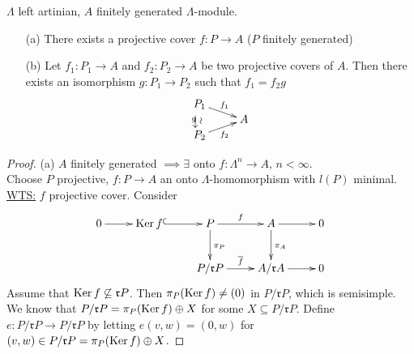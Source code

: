 \begin{thm}
\label{thm:proj-cov_unique}
$\Lambda$ left artinian, $A$ finitely generated $\Lambda$-module.
\begin{enumerate}
\item[(a)] There exists a projective cover $f:P\to A$ ($P$ finitely generated)
\item[(b)] Let $f_1 : P_1 \to A$ and $f_2 : P_2 \to A$ be two projective covers of $A$. Then there exists an isomorphism $g : P_1 \to P_2$ such that $f_1 = f_2g$
\[
\xymatrix@R-2pc{
P_1\ar@{}[dd]_g|-*[@]{\xrightarrow{\sim}} \ar[dr]^{f_1}\\
& A\\
P_2 \ar[ur]_{f_2}
}
\]
\end{enumerate}

\begin{proof}
(a) $A$ finitely generated $\implies \exists$ onto $f: \Lambda^n \to A$, $n < \infty$.\\
Choose $P$ projective, $f : P \to A$ an onto $\Lambda$-homomorphism
with $l(P)$ minimal. \underline{WTS:} $f$ projective cover. Consider 
\[
\xymatrix{
0\ar[r] & \Ker f \ar@{^{(}->}[r]  & P \ar[r]^f \ar[d]^{\pi_P} & A \ar[r] \ar[d]^{\pi_A} & 0\\
  &        & P/\mathfrak{r}P \ar[r]^{\overline{f}} & A/\mathfrak{r}A \ar[r] & 0
}
\]
Assume that $\operatorname{Ker}\nolimits f \not\subseteq \mathfrak{r}P$. Then $\pi_P(\operatorname{Ker}\nolimits f)
\neq (0)$ in $P/\mathfrak{r}P$, which is semisimple. We know that 
$ P/\mathfrak{r}P = \pi_P(\operatorname{Ker}\nolimits f) \oplus X $
for some $X \subseteq P/\mathfrak{r}P$. 
Define $e : P/\mathfrak{r}P \to P/\mathfrak{r}P$ by letting $e(v, w) =
(0, w)$ for $(v, w) \in P/\mathfrak{r}P = \pi_P(\operatorname{Ker}\nolimits f) \oplus X$. 


\end{proof}
\end{thm}
